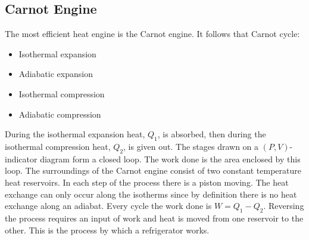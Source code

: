     \subsection{Carnot Engine}
    The most efficient heat engine is the Carnot engine.
    It follows that Carnot cycle:
    \begin{itemize}
        \item Isothermal expansion
        \item Adiabatic expansion
        \item Isothermal compression
        \item Adiabatic compression
    \end{itemize}
    During the isothermal expansion heat, \(Q_1\), is absorbed, then during the isothermal compression heat, \(Q_2\), is given out.
    The stages drawn on a \((P, V)\)-indicator diagram form a closed loop.
    The work done is the area enclosed by this loop.
    The surroundings of the Carnot engine consist of two constant temperature heat reservoirs.
    In each step of the process there is a piston moving.
    The heat exchange can only occur along the isotherms since by definition there is no heat exchange along an adiabat.
    Every cycle the work done is \(W = Q_1 - Q_2\).
    Reversing the process requires an input of work and heat is moved from one reservoir to the other.
    This is the process by which a refrigerator works.

